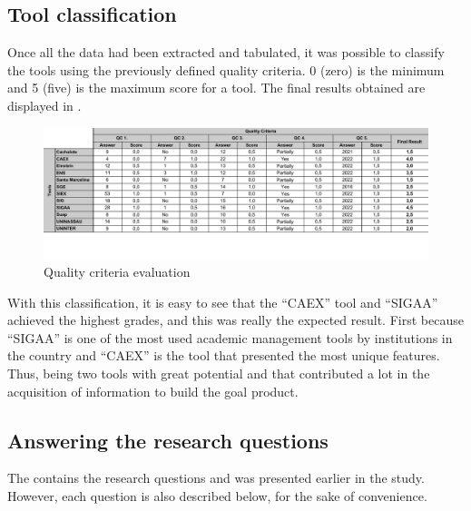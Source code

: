 \subsection{Tool classification}\label{sec:gl-tool-classification}

Once all the data had been extracted and tabulated, it was possible to classify the tools using the previously defined quality criteria. 0 (zero) is the minimum and 5 (five) is the maximum score for a tool. The final results obtained are displayed in .

\begin{figure}[htb]
  \caption{Quality criteria evaluation}\label{fig:gl-quality-criteria-results}
  \begin{center}
    \includegraphics[width=16cm]{img/gl-quality-criteria-results.pdf}
  \end{center}
\end{figure}

With this classification, it is easy to see that the ``CAEX'' tool and ``\ac{SIGAA}'' achieved the highest grades, and this was really the expected result. First because ``\ac{SIGAA}'' is one of the most used academic management tools by institutions in the country and ``CAEX'' is the tool that presented the most unique features. Thus, being two tools with great potential and that contributed a lot in the acquisition of information to build the goal product.

\subsection{Answering the research questions}\label{sec:gl-answer-research-questions}

The  contains the research questions and was presented earlier in the study. However, each question is also described below, for the sake of convenience.

